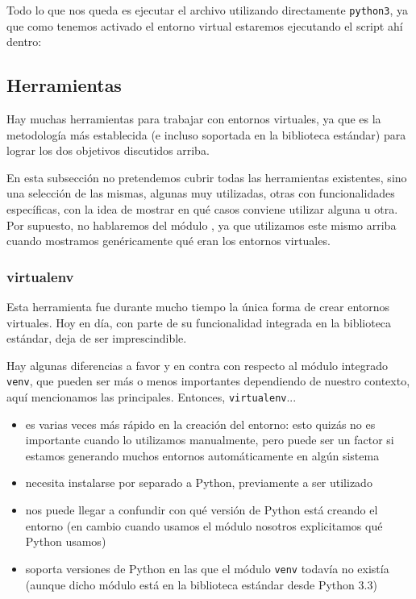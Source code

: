 Todo lo que nos queda es ejecutar el archivo utilizando directamente \texttt{python3}, ya que como tenemos activado el entorno virtual estaremos ejecutando el script ahí dentro:



\subsection{Herramientas} \label{sub:venvs-herramientas}

Hay muchas herramientas para trabajar con entornos virtuales, ya que es la metodología más establecida (e incluso soportada en la biblioteca estándar) para lograr los dos objetivos discutidos arriba.

En esta subsección no pretendemos cubrir todas las herramientas existentes, sino una selección de las mismas, algunas muy utilizadas, otras con funcionalidades específicas, con la idea de mostrar en qué casos conviene utilizar alguna u otra. Por supuesto, no hablaremos del módulo , ya que utilizamos este mismo arriba cuando mostramos genéricamente qué eran los entornos virtuales.

\subsubsection{virtualenv}

Esta herramienta fue durante mucho tiempo la única forma de crear entornos virtuales. Hoy en día, con parte de su funcionalidad integrada en la biblioteca estándar, deja de ser imprescindible.

Hay algunas diferencias a favor y en contra con respecto al módulo integrado \texttt{venv}, que pueden ser más o menos importantes dependiendo de nuestro contexto, aquí mencionamos las principales. Entonces, \texttt{virtualenv}...

\begin{itemize}
    \item es varias veces más rápido en la creación del entorno: esto quizás no es importante cuando lo utilizamos manualmente, pero puede ser un factor si estamos generando muchos entornos automáticamente en algún sistema
    \item necesita instalarse por separado a Python, previamente a ser utilizado
    \item nos puede llegar a confundir con qué versión de Python está creando el entorno (en cambio cuando usamos el módulo  nosotros explicitamos qué Python usamos)
    \item soporta versiones de Python en las que el módulo \texttt{venv} todavía no existía (aunque dicho módulo está en la biblioteca estándar desde Python 3.3)
\end{itemize}

